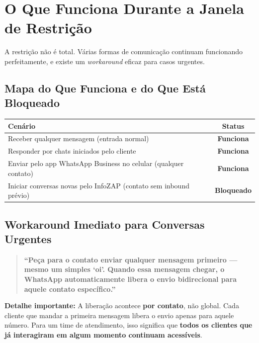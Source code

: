 \documentclass[12pt, a4paper]{article}
\begin{document}
\needspace{10cm}

\section{O Que Funciona Durante a Janela de Restrição}

A restrição não é total. Várias formas de comunicação continuam funcionando perfeitamente, e existe um \textit{workaround} eficaz para casos urgentes.

\subsection{Mapa do Que Funciona e do Que Está Bloqueado}

\begin{table}[H]
    \centering
    \renewcommand{\arraystretch}{1.4}
    \begin{tabularx}{\textwidth}{X c}
        \toprule
        \rowcolor{tableHeader} \textbf{Cenário} & \textbf{Status} \\
        \midrule
        Receber qualquer mensagem (entrada normal) & \textcolor{successGreen}{\textbf{Funciona}} \\
        \rowcolor{lightGray}
        Responder por chats iniciados pelo cliente & \textcolor{successGreen}{\textbf{Funciona}} \\
        Enviar pelo app WhatsApp Business no celular (qualquer contato) & \textcolor{successGreen}{\textbf{Funciona}} \\
        \rowcolor{lightGray}
        Iniciar conversas novas pelo InfoZAP (contato sem inbound prévio) & \textcolor{accentColor}{\textbf{Bloqueado}} \\
        \bottomrule
    \end{tabularx}
\end{table}

\subsection{Workaround Imediato para Conversas Urgentes}

\begin{quote}
\textcolor{primaryColor}{\textbf{``Peça para o contato enviar qualquer mensagem primeiro --- mesmo um simples `oi'. Quando essa mensagem chegar, o WhatsApp automaticamente libera o envio bidirecional para aquele contato específico.''}}
\end{quote}

\textcolor{accentColor}{\textbf{Detalhe importante:}} A liberação acontece \textbf{por contato}, não global. Cada cliente que mandar a primeira mensagem libera o envio apenas para aquele número. Para um time de atendimento, isso significa que \textbf{todos os clientes que já interagiram em algum momento continuam acessíveis}.
\end{document}
